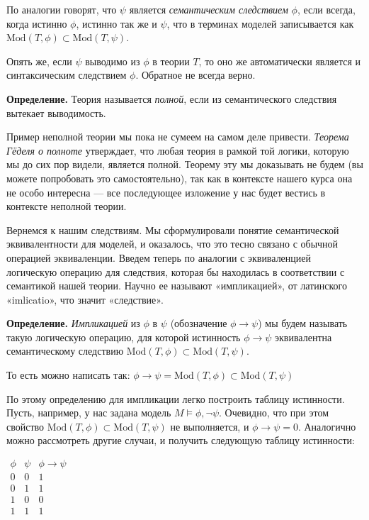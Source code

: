 По аналогии говорят, что $\psi$ является {\slshape семантическим следствием} $\phi$, если всегда, когда истинно $\phi$, истинно так же и $\psi$, что в терминах моделей записывается как $\mathrm{Mod}(T, \phi) \subset \mathrm{Mod}(T, \psi)$.

Опять же, если $\psi$ выводимо из $\phi$ в теории $T$, то оно же автоматически является и синтаксическим следствием $\phi$. Обратное не всегда верно.

{\bfseries Определение.} Теория называется {\slshape полной}, если из семантического следствия вытекает выводимость.

Пример неполной теории мы пока не сумеем на самом деле привести. {\slshape Теорема Гёделя о полноте} утверждает, что любая теория в рамкой той логики, которую мы до сих пор видели, является полной. Теорему эту мы доказывать не будем (вы можете попробовать это самостоятельно), так как в контексте нашего курса она не особо интересна — все последующее изложение у нас будет вестись в контексте неполной теории.

Вернемся к нашим следствиям. Мы сформулировали понятие семантической эквивалентности для моделей, и оказалось, что это тесно связано с обычной операцией эквиваленции. Введем теперь по аналогии с эквиваленцией логическую операцию для следствия, которая бы находилась в соответствии с семантикой нашей теории. Научно ее называют «импликацией», от латинского «imlicatio», что значит «следствие».

{\bfseries Определение.} {\slshape Импликацией} из $\phi$ в $\psi$ (обозначение $\phi\rightarrow \psi$) мы будем называть такую логическую операцию, для которой истинность $\phi\rightarrow\psi$ эквивалентна семантическому следствию $\mathrm{Mod}(T, \phi) \subset \mathrm{Mod}(T, \psi)$.

То есть можно написать так: $\phi\rightarrow\psi = \mathrm{Mod}(T, \phi) \subset \mathrm{Mod}(T, \psi)$

По этому определению для импликации легко построить таблицу истинности. Пусть, например, у нас задана модель $M\models\phi, \neg\psi$. Очевидно, что при этом свойство $\mathrm{Mod}(T, \phi) \subset \mathrm{Mod}(T, \psi)$ не выполняется, и $\phi\rightarrow\psi = 0$. Аналогично можно рассмотреть другие случаи, и получить следующую таблицу истинности:

$\begin{array}{cc|c}\phi&\psi&\phi\rightarrow\psi \\ \hline 0&0&1 \\ 0&1&1 \\ 1&0&0 \\ 1&1&1\end{array}$

